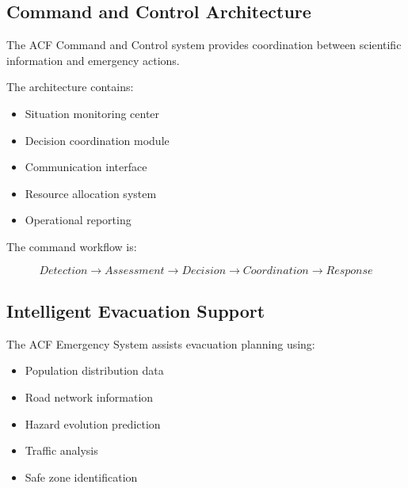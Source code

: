 \subsection{Command and Control Architecture}

The ACF Command and Control system provides coordination between
scientific information and emergency actions.

The architecture contains:

\begin{itemize}

\item Situation monitoring center

\item Decision coordination module

\item Communication interface

\item Resource allocation system

\item Operational reporting

\end{itemize}


The command workflow is:

\[
Detection
\rightarrow
Assessment
\rightarrow
Decision
\rightarrow
Coordination
\rightarrow
Response
\]



\subsection{Intelligent Evacuation Support}

The ACF Emergency System assists evacuation planning using:

\begin{itemize}

\item Population distribution data

\item Road network information

\item Hazard evolution prediction

\item Traffic analysis

\item Safe zone identification

\end{itemize}


